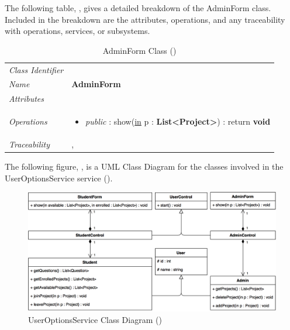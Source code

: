 \documentclass[12pt,letterpaper]{article}
\begin{document}
The following table, , gives a detailed breakdown of the AdminForm class. Included in the breakdown are the attributes, operations, and any traceability with operations, services, or subsystems.

\begin{table}[H]
    \caption{AdminForm Class ()} 
	\begin{tabu} to 
		\toprule
		Class Identifier &  \\
		Name & {\bf AdminForm} \\
		Attributes & \\

		Operations &
		\begin{minipage}[t]{\linewidth}
			\begin{itemize}
			    \item {\it public} : show(\underline{in} p : {\bf List<Project>}) : return {\bf void}
	        \end{itemize}
	    \end{minipage} \\
	    	Traceability & , \\
		\toprule
	\end{tabu}
\end{table}

\newpage{}
The following figure, , is a UML Class Diagram for the classes involved in the UserOptionsService service ().

\begin{figure}[H]
	\centering{}
	\includegraphics[scale=0.31]{imgs/d3/interfaces/user-options.png}
	\caption{UserOptionsService Class Diagram ()}
\end{figure}
\end{document}
